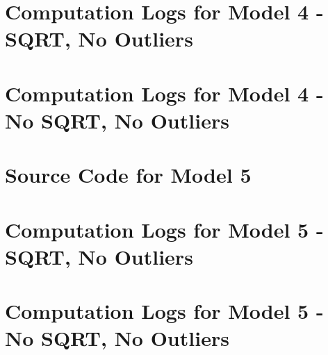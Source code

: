 \begin{landscape}
    \section{Computation Logs for Model 4 - SQRT, No Outliers}
    


    \newpage
    \section{Computation Logs for Model 4 - No SQRT, No Outliers}
    


\end{landscape}

\newpage
\section{Source Code for Model 5}


\begin{landscape}
    \section{Computation Logs for Model 5 - SQRT, No Outliers}
    


    \newpage
    \section{Computation Logs for Model 5 - No SQRT, No Outliers}
    

\end{landscape}


\newpage
